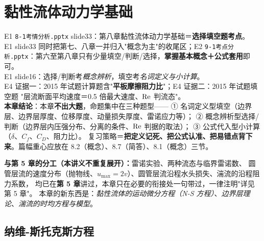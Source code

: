 \chapter{黏性流体动力学基础}

\begin{yijubox}
E1 \texttt{8-1考情分析.pptx} slide33：第八章黏性流体动力学基础＝\textbf{选择填空题考点}。\\
E1 slide33 同时把第七、八章一并归入"概念为主"的收尾区；E2 \texttt{9-1考点分析.pptx}：第六至第八章只有少量填空/判断/选择，\textbf{掌握基本概念＋公式套用}即可。\\
E1 slide16：选择/判断考\emph{概念辨析}，填空考\emph{名词定义与小计算}。\\
E4 证据一：2015 年试题计算题含"\textbf{平板摩擦阻力比}"；E4 证据二：2015 年试题填空题
"层流断面平均速度＝0.5 倍最大速度、$\mathrm{Re}$ 判流态"。\\
\textbf{本章结论}：本章\textbf{不出大题}，命题集中在三种题型——
① 名词定义型填空（边界层、边界层厚度、位移厚度、动量损失厚度、雷诺应力等）；
② 概念辨析型选择/判断（边界层内压强分布、分离的条件、$\mathrm{Re}$ 判据的取法）；
③ 公式代入型小计算（$\delta$、$C_f$、$C_D$、阻力比）。
复习策略＝\textbf{把定义记死、把公式认准、把易错点背下来}。篇幅重心应放在 8.2（概念）、8.7（简答）、8.1（概念）三节。
\end{yijubox}

\begin{tishi}
\textbf{与第 5 章的分工（本讲义不重复展开）：}雷诺实验、两种流态与临界雷诺数、
圆管层流的速度分布（抛物线、$u_{\max}=2v$）、圆管层流沿程水头损失、湍流的沿程阻力系数，
均已在\textbf{第 5 章}讲过，本章只在必要的衔接处一句带过，一律注明"详见第 5 章"。
本章的新东西是：\emph{黏性流体的运动微分方程（N-S 方程）}、\emph{边界层理论}、\emph{湍流的时均方程与模型}。
\end{tishi}

\section{纳维-斯托克斯方程}


